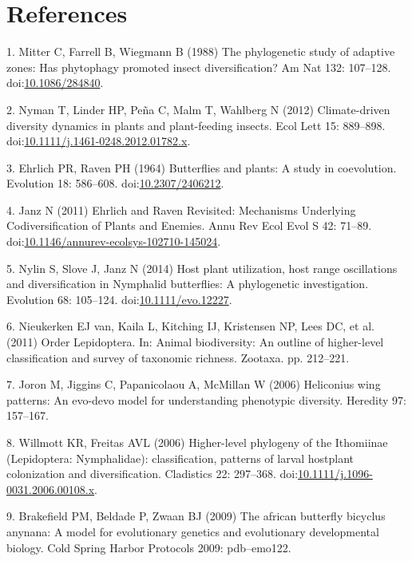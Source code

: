 \documentclass[10pt]{article}
\begin{document}
\section*{References}
1. Mitter C, Farrell B, Wiegmann B (1988) The phylogenetic study of
adaptive zones: Has phytophagy promoted insect diversification? Am Nat
132: 107--128.
doi:\href{http://dx.doi.org/10.1086/284840}{10.1086/284840}.

2. Nyman T, Linder HP, Peña C, Malm T, Wahlberg N (2012) Climate-driven
diversity dynamics in plants and plant-feeding insects. Ecol Lett 15:
889--898.
doi:\href{http://dx.doi.org/10.1111/j.1461-0248.2012.01782.x}{10.1111/j.1461-0248.2012.01782.x}.

3. Ehrlich PR, Raven PH (1964) Butterflies and plants: A study in
coevolution. Evolution 18: 586--608.
doi:\href{http://dx.doi.org/10.2307/2406212}{10.2307/2406212}.

4. Janz N (2011) Ehrlich and Raven Revisited: Mechanisms Underlying
Codiversification of Plants and Enemies. Annu Rev Ecol Evol S 42:
71--89.
doi:\href{http://dx.doi.org/10.1146/annurev-ecolsys-102710-145024}{10.1146/annurev-ecolsys-102710-145024}.

5. Nylin S, Slove J, Janz N (2014) Host plant utilization, host range
oscillations and diversification in Nymphalid butterflies: A
phylogenetic investigation. Evolution 68: 105--124.
doi:\href{http://dx.doi.org/10.1111/evo.12227}{10.1111/evo.12227}.

6. Nieukerken EJ van, Kaila L, Kitching IJ, Kristensen NP, Lees DC, et
al. (2011) Order Lepidoptera. In: Animal biodiversity: An outline of
higher-level classification and survey of taxonomic richness. Zootaxa.
pp. 212--221.

7. Joron M, Jiggins C, Papanicolaou A, McMillan W (2006) Heliconius wing
patterns: An evo-devo model for understanding phenotypic diversity.
Heredity 97: 157--167.

8. Willmott KR, Freitas AVL (2006) Higher-level phylogeny of the
Ithomiinae (Lepidoptera: Nymphalidae): classification, patterns of
larval hostplant colonization and diversification. Cladistics 22:
297--368.
doi:\href{http://dx.doi.org/10.1111/j.1096-0031.2006.00108.x}{10.1111/j.1096-0031.2006.00108.x}.

9. Brakefield PM, Beldade P, Zwaan BJ (2009) The african butterfly
bicyclus anynana: A model for evolutionary genetics and evolutionary
developmental biology. Cold Spring Harbor Protocols 2009: pdb--emo122.
\end{document}
